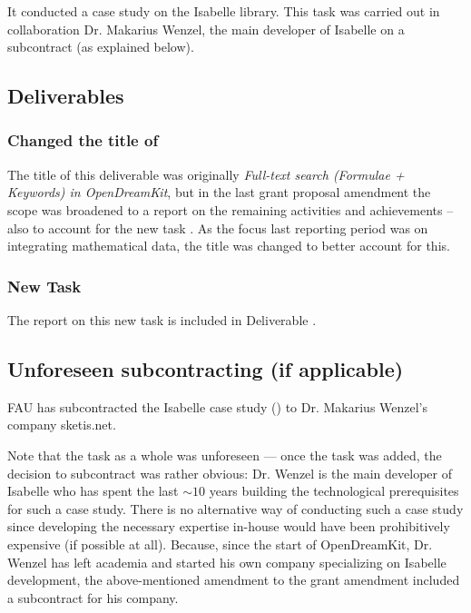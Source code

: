 It conducted a case study on the Isabelle library.
This task was carried out in collaboration Dr. Makarius Wenzel, the main developer of Isabelle on a subcontract (as explained below).

\subsection{Deliverables}

\subsubsection{Changed the title of }
The title of this deliverable was originally \emph{Full-text search (Formulae + Keywords) in OpenDreamKit}, but in the last grant proposal amendment the scope was broadened to a report on the remaining  activities and achievements -- also to account for the new task . As the focus last reporting period was on integrating mathematical data, the title was changed to better account for this.

\subsubsection{New Task }
The report on this new task is included in Deliverable .

\subsection{Unforeseen subcontracting (if applicable)}
FAU has subcontracted the Isabelle case study () to Dr. Makarius Wenzel's company sketis.net.

Note that the task as a whole was unforeseen --- once the task was added, the decision to subcontract was rather obvious:
Dr. Wenzel is the main developer of Isabelle who has spent the last $\sim 10$ years building the technological prerequisites for such a case study.
There is no alternative way of conducting such a case study since developing the necessary expertise in-house would have been prohibitively expensive (if possible at all).
Because, since the start of OpenDreamKit, Dr. Wenzel has left academia and started his own company specializing on Isabelle development, the above-mentioned amendment to the grant amendment included a subcontract for his company.



